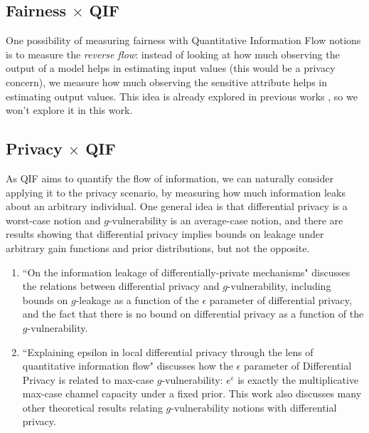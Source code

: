 \documentclass[conference]{IEEEtran}
\newcommand{\qm}[1]{``#1"}
\begin{document}
\subsection{Fairness $\times$ QIF}

One possibility of measuring fairness with Quantitative Information Flow notions is to measure the \emph{reverse flow}: instead of looking at how much observing the output of a model helps in estimating input values (this would be a privacy concern), we measure how much observing the sensitive attribute helps in estimating output values. This idea is already explored in previous works \cite{Bruno}\cite{nogueira2023relation}, so we won't explore it in this work.

\subsection{Privacy $\times$ QIF}

As QIF aims to quantify the flow of information, we can naturally consider applying it to the privacy scenario, by measuring how much information leaks about an arbitrary individual. One general idea is that differential privacy is a worst-case notion and $g$-vulnerability is an average-case notion, and there are results \cite{QIF} showing that differential privacy implies bounds on leakage under arbitrary gain functions and prior distributions, but not the opposite.

\begin{enumerate}
	\item \qm{On the information leakage of differentially-private mechanisms} \cite{alvim2015information} discusses the relations between differential privacy and $g$-vulnerability, including bounds on $g$-leakage as a function of the $\epsilon$ parameter of differential privacy, and the fact that there is no bound on differential privacy as a function of the $g$-vulnerability.
	\item \qm{Explaining epsilon in local differential privacy through the lens of quantitative information flow} \cite{fernandes2022explaining} discusses how the $\epsilon$ parameter of Differential Privacy is related to max-case $g$-vulnerability: $e^\epsilon$ is exactly the multiplicative max-case channel capacity under a fixed prior. This work also discusses many other theoretical results relating $g$-vulnerability notions with differential privacy.
\end{enumerate}
\end{document}

